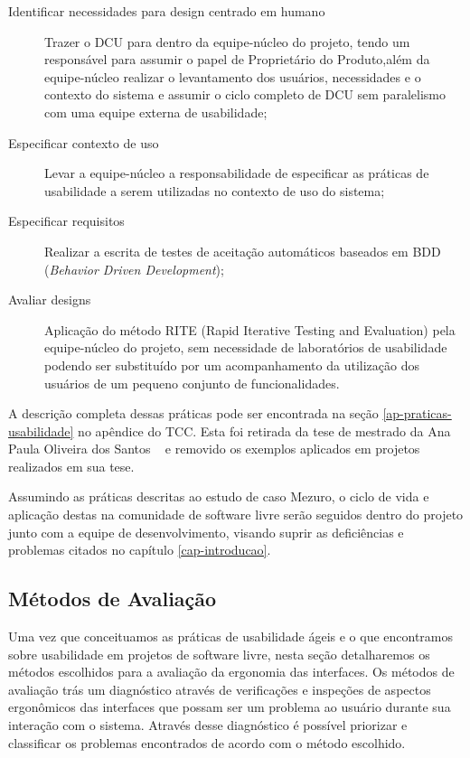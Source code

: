 \begin{description}
\item[Identificar necessidades para design centrado em humano] Trazer o DCU para dentro da equipe-núcleo do projeto, tendo um responsável para assumir o papel de Proprietário do Produto,além da equipe-núcleo realizar o levantamento dos usuários, necessidades e o contexto do sistema e assumir o ciclo completo de DCU sem paralelismo com uma equipe externa de usabilidade;
\item[Especificar contexto de uso] Levar a equipe-núcleo a responsabilidade de especificar as práticas de usabilidade a serem utilizadas no contexto de uso do sistema;
\item[Especificar requisitos] Realizar a escrita de testes de aceitação automáticos baseados em BDD (\textit{Behavior Driven Development});
\item[Avaliar designs] Aplicação do método RITE (Rapid Iterative Testing and Evaluation) pela equipe-núcleo do projeto, sem necessidade de laboratórios de usabilidade podendo ser substituído por um acompanhamento da utilização dos usuários de um pequeno conjunto de funcionalidades.
\end{description}

A descrição completa dessas práticas pode ser encontrada na seção \ref{ap-praticas-usabilidade} no apêndice do TCC. Esta foi retirada da tese de mestrado da Ana Paula Oliveira dos Santos ~\cite{santos2012} e removido os exemplos aplicados em projetos realizados em sua tese. 

%
Assumindo as práticas descritas ao estudo de caso Mezuro, o ciclo de vida e aplicação destas na comunidade de software livre serão seguidos dentro do projeto junto com a equipe de desenvolvimento, visando suprir as deficiências e problemas citados no capítulo \ref{cap-introducao}.

\subsection{Métodos de Avaliação}
\label{metodos-avaliacao}

Uma  vez que conceituamos as práticas de usabilidade ágeis e o que 
encontramos sobre usabilidade em projetos de software livre, nesta seção
detalharemos os métodos escolhidos para a avaliação da ergonomia das interfaces. Os métodos de avaliação trás um diagnóstico através de verificações e inspeções de aspectos ergonômicos das interfaces que possam ser um problema ao usuário durante sua interação com o sistema. Através desse diagnóstico é possível priorizar e classificar os problemas encontrados de acordo com o método escolhido.

